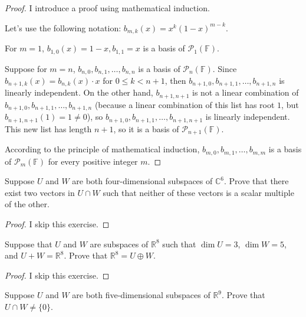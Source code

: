 \begin{proof}
    I introduce a proof using mathematical induction.

    Let's use the following notation: $b_{m,k}(x) = x^{k}{(1-x)}^{m-k}$.

    For $m = 1$, $b_{1,0}(x) = 1-x, b_{1,1} = x$ is a basis of $\mathcal{P}_{1}(\mathbb{F})$.

    Suppose for $m = n$, $b_{n,0}, b_{n,1}, \ldots, b_{n,n}$ is a basis of $\mathcal{P}_{n}(\mathbb{F})$. Since $b_{n+1,k}(x) = b_{n,k}(x)\cdot x$ for $0\leq k < n+1$, then $b_{n+1,0}, b_{n+1,1}, \ldots, b_{n+1,n}$ is linearly independent. On the other hand, $b_{n+1,n+1}$ is not a linear combination of $b_{n+1,0}, b_{n+1,1}, \ldots, b_{n+1,n}$ (because a linear combination of this list has root $1$, but $b_{n+1, n+1}(1) = 1\ne 0$), so $b_{n+1,0}, b_{n+1,1}, \ldots, b_{n+1,n+1}$ is linearly independent. This new list has length $n+1$, so it is a basis of $\mathcal{P}_{n+1}(\mathbb{F})$.

    According to the principle of mathematical induction, $b_{m,0}, b_{m,1}, \ldots, b_{m,m}$ is a basis of $\mathcal{P}_{m}(\mathbb{F})$ for every positive integer $m$.
\end{proof}

\begin{exercise}
    Suppose $U$ and $W$ are both four-dimensional subspaces of $\mathbb{C}^{6}$. Prove that there exist two vectors in $U \cap W$ such that neither of these vectors is a scalar multiple of the other.
\end{exercise}

\begin{proof}
    I skip this exercise.
\end{proof}

\begin{exercise}
    Suppose that $U$ and $W$ are subspaces of $\mathbb{R}^{8}$ such that $\dim U = 3$, $\dim W = 5$, and $U + W = \mathbb{R}^{8}$. Prove that $\mathbb{R}^{8} = U \oplus W$.
\end{exercise}

\begin{proof}
    I skip this exercise.
\end{proof}

\begin{exercise}
    Suppose $U$ and $W$ are both five-dimensional subspaces of $\mathbb{R}^{9}$. Prove that $U \cap W \ne \{0\}$.
\end{exercise}

